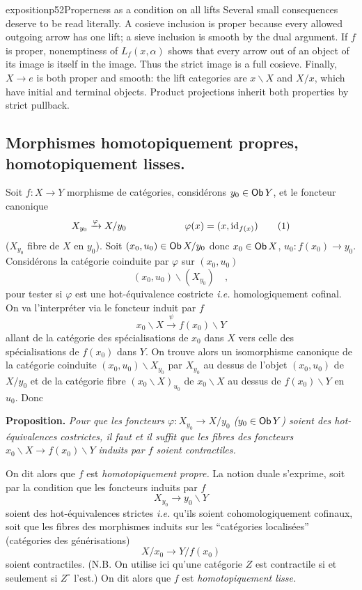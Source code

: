 \begin{dcomment}{exposition}{p52}{Properness as a condition on all lifts}
Several small consequences deserve to be read literally. A cosieve inclusion is proper because every allowed outgoing arrow has one lift; a sieve inclusion is smooth by the dual argument. If $f$ is proper, nonemptiness of $L_f(x,\alpha)$ shows that every arrow out of an object of its image is itself in the image. Thus the strict image is a full cosieve. Finally, $X\to e$ is both proper and smooth: the lift categories are $x\backslash X$ and $X/x$, which have initial and terminal objects. Product projections inherit both properties by strict pullback.
\end{dcomment}


\subsection*{Morphismes homotopiquement propres, homotopiquement lisses.}

\noindent Soit $f : X \to Y$ morphisme de catégories, considérons $y_0 \in \mathsf{Ob}\, Y$, et le foncteur canonique
\[
X_{y_0} \xrightarrow{\varphi} X/y_0 \qquad\qquad\qquad \varphi(x) = (x, \id_{f(x)}) \tag*{(1)}
\]
($X_{y_0}$ fibre de $X$ en $y_0$). Soit $(x_0, u_0) \in \mathsf{Ob}\, X/y_0$ donc $x_0 \in \mathsf{Ob}\, X$, $u_0 : f(x_0) \to y_0$. Considérons la catégorie coinduite par $\varphi$ sur $(x_0, u_0)$
\[
(x_0, u_0)\backslash(X_{y_0}) \quad ,
\]
pour tester si $\varphi$ est une hot-équivalence costricte \textit{i.e.} homologiquement cofinal. On va l'interpréter via le foncteur induit par $f$
\[
x_0\backslash X \xrightarrow{\psi} f(x_0)\backslash Y
\]
allant de la catégorie des spécialisations de $x_0$ dans $X$ vers celle des spécialisations de $f(x_0)$ dans $Y$. On trouve alors un isomorphisme canonique de la catégorie coinduite $(x_0, u_0)\backslash X_{y_0}$ par $X_{y_0}$ au dessus de l'objet $(x_0, u_0)$ de $X/y_0$ et de la catégorie fibre $(x_0\backslash X)_{u_0}$ de $x_0\backslash X$ au dessus de $f(x_0)\backslash Y$ en $u_0$. Donc

\noindent\textbf{Proposition.} \textit{Pour que les foncteurs $\varphi : X_{y_0} \to X/y_0$ ($y_0 \in \mathsf{Ob}\, Y$) soient des hot-équivalences costrictes, il faut et il suffit que les fibres des foncteurs $x_0\backslash X \to f(x_0)\backslash Y$ induits par $f$ soient contractiles.}

\noindent{}
On dit alors que $f$ est \textit{homotopiquement propre.} La notion duale s'exprime, soit par la condition que les foncteurs induits par $f$
\[
X_{y_0} \longrightarrow y_0\backslash Y
\]
soient des hot-équivalences strictes \textit{i.e.} qu'ils soient cohomologiquement cofinaux, soit que les fibres des morphismes induits sur les ``catégories localisées'' (catégories des générisations)
\[
X/x_0 \longrightarrow Y/f(x_0)
\]
soient contractiles. (N.B. On utilise ici qu'une catégorie $Z$ est contractile si et seulement si $Z^\circ$ l'est.) On dit alors que $f$ est \textit{homotopiquement lisse.}

